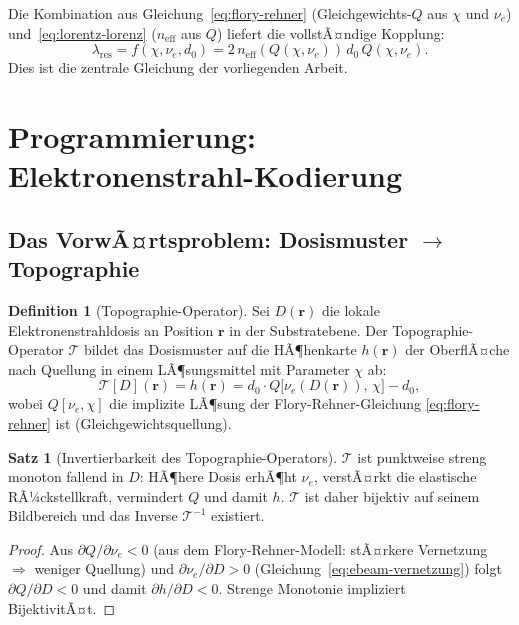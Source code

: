 ﻿\documentclass[a4paper,12pt]{article}
\theoremstyle{definition}
\newtheorem{definition}{Definition}[section]
\newtheorem{satz}{Satz}[section]
\newcommand{\neff}{n_\mathrm{eff}}
\newcommand{\vect}[1]{\bm{#1}}
\begin{document}
	Die Kombination aus Gleichung~\eqref{eq:flory-rehner} (Gleichgewichts-$Q$
	aus $\chi$ und $\nu_e$) und~\eqref{eq:lorentz-lorenz} ($\neff$ aus $Q$)
	liefert die vollstÃ¤ndige Kopplung:
	\begin{equation}
		\boxed{\lambda_\mathrm{res} = f(\chi, \nu_e, d_0) = 2\,\neff(Q(\chi,\nu_e))\,d_0\,Q(\chi,\nu_e).}
		\label{eq:kopplungsgleichung}
	\end{equation}
	Dies ist die zentrale Gleichung der vorliegenden Arbeit.
	
	\section{Programmierung: Elektronenstrahl-Kodierung}
	\label{sec:textur}
	
	\subsection{Das VorwÃ¤rtsproblem: Dosismuster $\to$ Topographie}
	
	\begin{definition}[Topographie-Operator]
		\label{def:topo-operator}
		Sei $D(\vect{r})$ die lokale Elektronenstrahldosis an Position $\vect{r}$
		in der Substratebene. Der Topographie-Operator $\mathcal{T}$ bildet das
		Dosismuster auf die HÃ¶henkarte $h(\vect{r})$ der OberflÃ¤che nach Quellung
		in einem LÃ¶sungsmittel mit Parameter $\chi$ ab:
		\begin{equation}
			\mathcal{T}[D](\vect{r}) = h(\vect{r})
			= d_0 \cdot Q\bigl[\nu_e(D(\vect{r})),\, \chi\bigr] - d_0,
			\label{eq:topo-operator}
		\end{equation}
		wobei $Q[\nu_e, \chi]$ die implizite LÃ¶sung der Flory-Rehner-Gleichung
		\eqref{eq:flory-rehner} ist (Gleichgewichtsquellung).
	\end{definition}
	
	\begin{satz}[Invertierbarkeit des Topographie-Operators]
		\label{satz:invertierbarkeit}
		$\mathcal{T}$ ist punktweise streng monoton fallend in $D$: HÃ¶here Dosis
		erhÃ¶ht $\nu_e$, verstÃ¤rkt die elastische RÃ¼ckstellkraft, vermindert $Q$
		und damit $h$. $\mathcal{T}$ ist daher bijektiv auf seinem Bildbereich
		und das Inverse $\mathcal{T}^{-1}$ existiert.
	\end{satz}
	
	\begin{proof}
		Aus $\partial Q/\partial\nu_e < 0$ (aus dem Flory-Rehner-Modell:
		stÃ¤rkere Vernetzung $\Rightarrow$ weniger Quellung) und
		$\partial\nu_e/\partial D > 0$ (Gleichung~\eqref{eq:ebeam-vernetzung})
		folgt $\partial Q/\partial D < 0$ und damit $\partial h/\partial D < 0$.
		Strenge Monotonie impliziert BijektivitÃ¤t.
	\end{proof}
	
\end{document}

